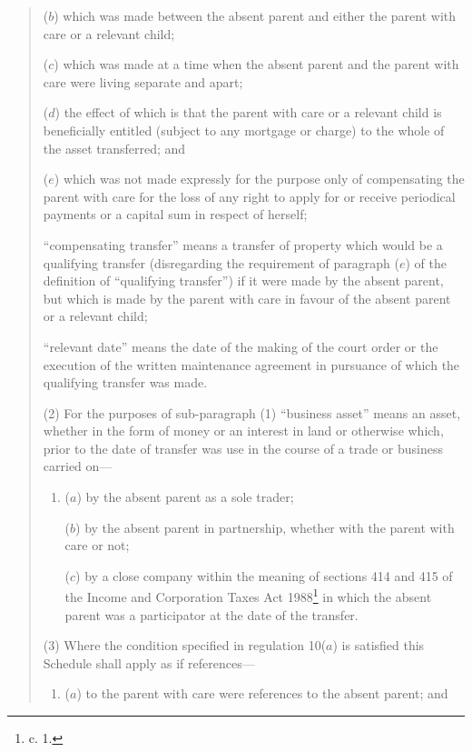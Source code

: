 \documentclass[a4paper]{article}
\begin{document}
\begin{quotation}
\begin{enumerate}
\begin{enumerate}
($b$) which was made between the absent parent and either the parent with care or a relevant child;

($c$) which was made at a time when the absent parent and the parent with care were living separate and apart;

($d$) the effect of which is that the parent with care or a relevant child is beneficially entitled (subject to any mortgage or charge) to the whole of the asset transferred; and 

($e$) which was not made expressly for the purpose only of compensating the parent with care for the loss of any right to apply for or receive periodical payments or a capital sum in respect of herself;
\end{enumerate}

“compensating transfer” means a transfer of property which would be a qualifying transfer (disregarding the requirement of paragraph ($e$) of the definition of “qualifying transfer”) if it were made by the absent parent, but which is made by the parent with care in favour of the absent parent or a relevant child;

“relevant date” means the date of the making of the court order or the execution of the written maintenance agreement in pursuance of which the qualifying transfer was made.
\end{enumerate}

(2) For the purposes of sub-paragraph (1) “business asset” means an asset, whether in the form of money or an interest in land or otherwise which, prior to the date of transfer was use in the course of a trade or business carried on—
\begin{enumerate}\item[]
($a$) by the absent parent as a sole trader;

($b$) by the absent parent in partnership, whether with the parent with care or not;

($c$) by a close company within the meaning of sections 414 and 415 of the Income and Corporation Taxes Act 1988\footnote{ c. 1.} in which the absent parent was a participator at the date of the transfer.
\end{enumerate}

(3) Where the condition specified in regulation 10($a$) is satisfied this Schedule shall apply as if references—
\begin{enumerate}\item[]
($a$) to the parent with care were references to the absent parent; and


\end{enumerate}
\end{quotation}
\end{document}
